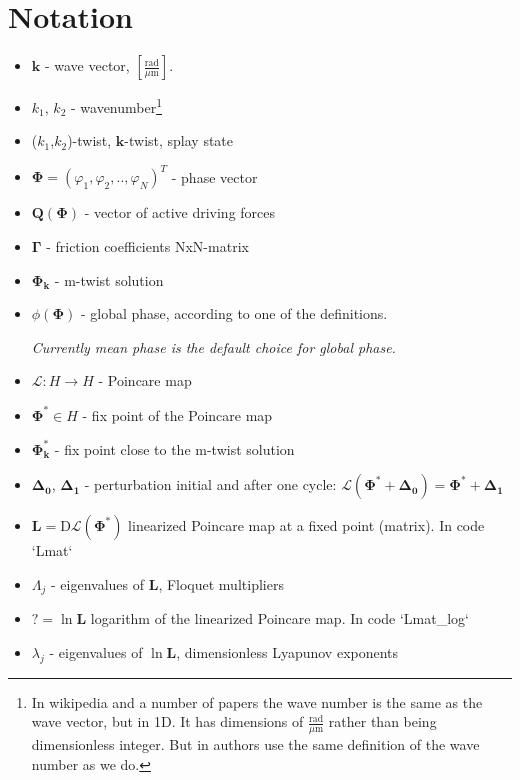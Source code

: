 \documentclass[a4paper,12pt]{article}
\renewcommand*{\vec}[1]{\mathbf{#1}}
\newcommand*{\Lmat}{\mathbf{L}}  %
\begin{document}
\setcounter{secnumdepth}{0} %
\setcounter{tocdepth}{2} %

\tableofcontents

\clearpage



\section{Notation}

\begin{itemize}
\item $\mathbf{k}$ - wave vector, $[\frac{\text{rad}}{\mu\text{m}}]$. 
\item $k_1$, $k_2$ - wavenumber\footnote{In wikipedia and a number of papers the wave number is the same as the wave vector, but in 1D. It has dimensions of $\frac{\text{rad}}{\mu\text{m}}$ rather than being dimensionless integer. But in \cite{zou2009} authors use the same definition of the wave number as we do.}
\item ($k_1$,$k_2$)-twist, $\vec{k}$-twist, splay state \cite{strogatz1993}
		
\item $\mathbf{\Phi}= (\varphi_1, \varphi_2, .., \varphi_{N})^T $ - phase vector
\item $ \mathbf{Q(\Phi)}$ - vector of active driving forces
\item $ \mathbf{\Gamma}$ - friction coefficients NxN-matrix
\item $\mathbf{\Phi_k}$ - m-twist solution
\item $\phi(\mathbf{\Phi})$ - global phase, according to one of the definitions. 

	\textit{Currently mean phase is the default choice for global phase.}
\item $\mathcal{L}: H \rightarrow H$ - Poincare map
\item $\mathbf{\Phi^*} \in H$ - fix point of the Poincare map
\item $\mathbf{\Phi^{*}_k}$ - fix point close to the m-twist solution
\item $\mathbf{\Delta_0}$, $\mathbf{\Delta_1}$ - perturbation initial and after one cycle: $\mathcal{L}(\mathbf{\Phi^{*}} + \mathbf{\Delta_0}) = \mathbf{\Phi^{*}} + \mathbf{\Delta_1}$
\item $\mathbf{L} = \mathrm{D}\mathcal{L}(\mathbf{\Phi^*})$ linearized Poincare map at a fixed point (matrix). In code `Lmat`
\item $\Lambda_j$ - eigenvalues of $\Lmat$, Floquet multipliers
\item $? = \ln \Lmat $  logarithm of the linearized Poincare map. In code `Lmat\_log`
\item $\lambda_j$ - eigenvalues of $\ln \mathbf{L}$, dimensionless Lyapunov exponents
\end{itemize}
\end{document}
